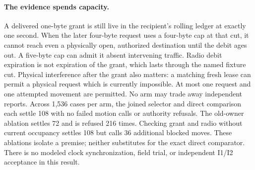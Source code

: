 \documentclass{article}
\begin{document}
\paragraph{The evidence spends capacity.}
A delivered one-byte grant is still live in the recipient's rolling
ledger at exactly one second. When the later four-byte request uses a
four-byte cap at that cut, it cannot reach even a physically open,
authorized destination until the debit ages out. A five-byte cap can
admit it absent intervening traffic. Radio debit expiration is not
expiration of the grant, which lasts through the named fixture cut.
Physical interference after the grant also matters: a matching fresh
lease can permit a physical request which is currently impossible.
At most one request and one attempted movement are permitted. No arm
may trade away independent reports. Across 1,536 cases per arm, the
joined selector and direct comparison each settle 108 with no failed
motion calls or authority refusals. The old-owner ablation settles 72
and is refused 216 times. Checking grant and radio without current
occupancy settles 108 but calls 36 additional blocked moves. These
ablations isolate a premise; neither substitutes for the exact direct
comparator. There is no modeled clock synchronization, field trial,
or independent I1/I2 acceptance in this result.
\end{document}
